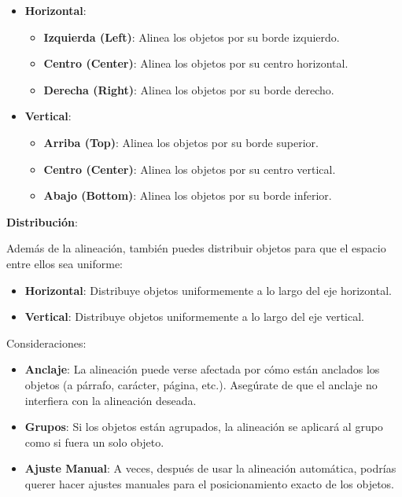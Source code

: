 \documentclass[
  jou,
  floatsintext,
  longtable,
  a4paper,
  nolmodern,
  notxfonts,
  notimes,
  colorlinks=true,linkcolor=blue,citecolor=blue,urlcolor=blue]{apa7}
\begin{document}
\begin{itemize}
\item
  \textbf{Horizontal}:

  \begin{itemize}
  \item
    \textbf{Izquierda (Left)}: Alinea los objetos por su borde
    izquierdo.
  \item
    \textbf{Centro (Center)}: Alinea los objetos por su centro
    horizontal.
  \item
    \textbf{Derecha (Right)}: Alinea los objetos por su borde derecho.
  \end{itemize}
\item
  \textbf{Vertical}:

  \begin{itemize}
  \item
    \textbf{Arriba (Top)}: Alinea los objetos por su borde superior.
  \item
    \textbf{Centro (Center)}: Alinea los objetos por su centro vertical.
  \item
    \textbf{Abajo (Bottom)}: Alinea los objetos por su borde inferior.
  \end{itemize}
\end{itemize}

\textbf{Distribución}:

Además de la alineación, también puedes distribuir objetos para que el
espacio entre ellos sea uniforme:

\begin{itemize}
\item
  \textbf{Horizontal}: Distribuye objetos uniformemente a lo largo del
  eje horizontal.
\item
  \textbf{Vertical}: Distribuye objetos uniformemente a lo largo del eje
  vertical.
\end{itemize}

Consideraciones:

\begin{itemize}
\item
  \textbf{Anclaje}: La alineación puede verse afectada por cómo están
  anclados los objetos (a párrafo, carácter, página, etc.). Asegúrate de
  que el anclaje no interfiera con la alineación deseada.
\item
  \textbf{Grupos}: Si los objetos están agrupados, la alineación se
  aplicará al grupo como si fuera un solo objeto.
\item
  \textbf{Ajuste Manual}: A veces, después de usar la alineación
  automática, podrías querer hacer ajustes manuales para el
  posicionamiento exacto de los objetos.
\end{itemize}
\end{document}
